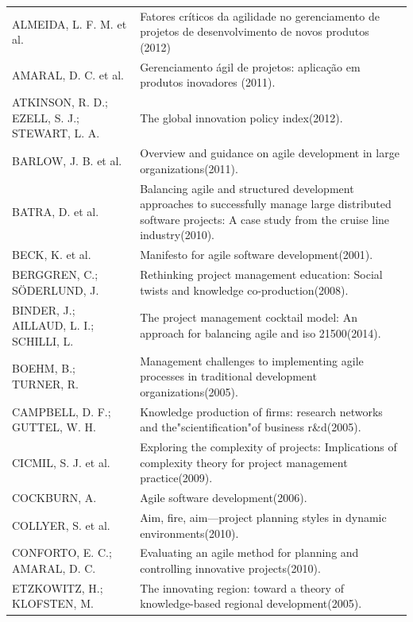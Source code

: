 \begin{longtable}{| p{} | p{} |}
  \cline{1-2}
  \cellcolor[HTML]{C0C0C0}{\color[HTML]{000000} Autor(es)} & \cellcolor[HTML]{C0C0C0}{\color[HTML]{000000} Publicação} \\ \hline
  ALMEIDA, L. F. M. et al. & Fatores críticos da agilidade no gerenciamento de projetos de desenvolvimento de novos produtos (2012) \\ \hline
  AMARAL, D. C. et al. & Gerenciamento ágil de projetos: aplicação em produtos inovadores (2011). \\ \hline
  ATKINSON, R. D.; EZELL, S. J.; STEWART, L. A. & The global innovation policy index(2012). \\ \hline
  BARLOW, J. B. et al. & Overview and guidance on agile development in large organizations(2011). \\ \hline
  BATRA, D. et al. & Balancing agile and structured development approaches to successfully manage large distributed software projects: A case study from the cruise line industry(2010). \\ \hline
  BECK, K. et al. & Manifesto for agile software development(2001). \\ \hline
  BERGGREN, C.; SÖDERLUND, J. & Rethinking project management education: Social twists and knowledge co-production(2008). \\ \hline
  BINDER, J.; AILLAUD, L. I.; SCHILLI, L. & The project management cocktail model: An approach for balancing agile and iso 21500(2014). \\ \hline
  BOEHM, B.; TURNER, R. & Management challenges to implementing agile processes in traditional development organizations(2005). \\ \hline
  CAMPBELL, D. F.; GUTTEL, W. H. & Knowledge production of firms: research networks and the"scientification"of business r\&d(2005). \\ \hline
  CICMIL, S. J. et al. & Exploring the complexity of projects: Implications of complexity theory for project management practice(2009). \\ \hline
  COCKBURN, A. & Agile software development(2006). \\ \hline
  COLLYER, S. et al. & Aim, fire, aim—project planning styles in dynamic environments(2010). \\ \hline
  CONFORTO, E. C.; AMARAL, D. C. & Evaluating an agile method for planning and controlling innovative projects(2010). \\ \hline
  ETZKOWITZ, H.; KLOFSTEN, M. & The innovating region: toward a theory of knowledge-based regional development(2005). \\ \hline

\end{longtable}
